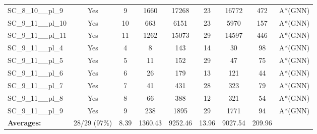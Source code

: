\documentclass{article}
\begin{document}
\begin{tabular}{lcccccccc}
SC\_8\_10\_\_pl\_9 & Yes & 9 & 1660 & 17268 & 23 & 16772 & 472 & A*(GNN) \\
SC\_9\_11\_\_pl\_10 & Yes & 10 & 663 & 6151 & 23 & 5970 & 157 & A*(GNN) \\
SC\_9\_11\_\_pl\_11 & Yes & 11 & 1262 & 15073 & 29 & 14597 & 446 & A*(GNN) \\
SC\_9\_11\_\_pl\_4 & Yes & 4 & 8 & 143 & 14 & 30 & 98 & A*(GNN) \\
SC\_9\_11\_\_pl\_5 & Yes & 5 & 11 & 152 & 29 & 47 & 75 & A*(GNN) \\
SC\_9\_11\_\_pl\_6 & Yes & 6 & 26 & 179 & 13 & 121 & 44 & A*(GNN) \\
SC\_9\_11\_\_pl\_7 & Yes & 7 & 41 & 431 & 28 & 323 & 79 & A*(GNN) \\
SC\_9\_11\_\_pl\_8 & Yes & 8 & 66 & 388 & 12 & 321 & 54 & A*(GNN) \\
SC\_9\_11\_\_pl\_9 & Yes & 9 & 238 & 1895 & 29 & 1771 & 94 & A*(GNN) \\
\textbf{Averages:} & 28/29 (97\%) & 8.39 & 1360.43 & 9252.46 & 13.96 & 9027.54 & 209.96 & \\
\bottomrule
\end{tabular}
\\[0.7cm]
\end{document}
